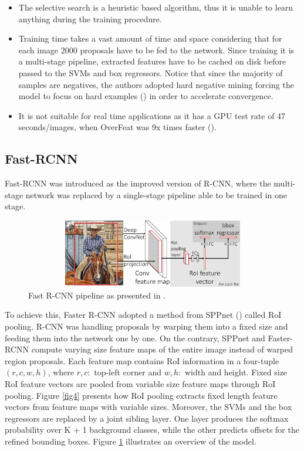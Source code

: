 \begin{itemize}
  \item The selective search is a heuristic based algorithm, thus it is unable to learn anything during the training procedure. 
  \item Training time takes a vast amount of time and space considering that for each image 2000 proposals have to be fed to the network. Since training it is a multi-stage pipeline, extracted features have to be cached on disk before passed to the SVMs and box regressors. Notice that since the majority of samples are negatives, the authors adopted hard negative mining forcing the model to focus on hard examples (\cite{felzenszwalb2009object}) in order to accelerate convergence.
  \item It is not suitable for real time applications as it has a GPU test rate of  47 seconds/images, when OverFeat was 9x times faster (\cite{girshick2015fast}). 
\end{itemize}

\subsection{Fast-RCNN}
Fast-RCNN was introduced as the improved version of R-CNN, where the multi-stage network was replaced by a single-stage pipeline able to be trained in one stage.

\begin{figure}[!htb]
  \centering
  \includegraphics[width=12cm, height=3cm]{images/ch2/fig3.png}
  \caption{Fast R-CNN pipeline as presented in \cite{girshick2015fast}.}
  \label{fig3}
\end{figure}

To achieve this, Faster R-CNN adopted a method from SPPnet (\cite{he2015spatial}) called RoI pooling. R-CNN was handling proposals by warping them into a fixed size and feeding them into the network one by one. On the contrary, SPPnet and Faster-RCNN compute varying size feature maps of the entire image instead of warped region proposals. Each feature map contains RoI information in a four-tuple $(r,c,w,h)$, where $r, c:$ top-left corner and $w, h:$ width and height. Fixed size RoI feature vectors are pooled from variable size feature maps through RoI pooling. Figure \ref{fig4} presents how RoI pooling extracts fixed length feature vectors from feature maps with variable sizes. Moreover, the SVMs and the box regressors are replaced by a joint sibling layer. One layer produces the softmax probability over K + 1 background classes, while the other predicts offsets for the refined bounding boxes. Figure \ref{fig3} illustrates an overview of the model. 

